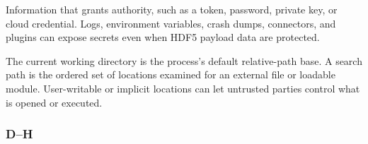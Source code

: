 \documentclass[../main.tex]{subfiles}
\begin{document}
\begin{description}[leftmargin=1.5em,style=nextline]
\item[Credential / secret.]
Information that grants authority, such as a token, password, private key, or
cloud credential. Logs, environment variables, crash dumps, connectors, and
plugins can expose secrets even when HDF5 payload data are protected.

\item[Current working directory / search path.]
The current working directory is the process's default relative-path base. A
search path is the ordered set of locations examined for an external file or
loadable module. User-writable or implicit locations can let untrusted parties
control what is opened or executed.

\end{description}

\subsubsection{D--H}
\label{glossary:dh}
\end{document}
